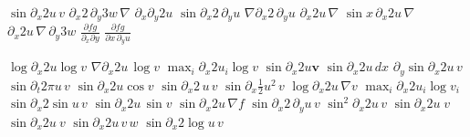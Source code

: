 \documentclass{article}
\begin{document}
$\sin\partial_x 2u\,v$ $\partial_x 2\,\partial_y 3w\,\nabla$ $\partial_x\partial_y 2u$ $\sin\partial_x 2\,\partial_y u$ $\nabla\partial_x 2\,\partial_y u$
$\partial_x 2u\,\nabla$ $\sin x\,\partial_x 2u\,\nabla$ $\partial_x 2u\,\nabla\,\partial_y 3w$ $\frac{\partial fg}{\partial_x\partial y}$
$\frac{\partial fg}{\partial x\,\partial_y u}$

$\log\partial_x 2u\log v$ $\nabla\partial_x 2u\,\log v$ $\max_i\partial_x 2u_i\log v$ $\sin\partial_x 2u\mathbf{v}$ $\sin\partial_x 2u\,dx$
$\partial_y\sin\partial_x 2u\,v$ $\sin\partial_t 2\pi u\,v$ $\sin\partial_x 2u\cos v$ $\sin\partial_x 2\,u\,v$ $\sin\partial_x\frac12 u^2\,v$
$\log\partial_x 2u\,\nabla v$ $\max_i\partial_x 2u_i\log v_i$ $\sin\partial_x 2\sin u\,v$ $\sin\partial_x 2u\,\sin v$ $\sin\partial_x 2u\,\nabla f$
$\sin\partial_x 2\,\partial_y u\,v$
$\sin^2\partial_x 2u\,v$ $\sin\partial_x 2u\;v$ $\sin\partial_x 2u~v$ $\sin\partial_x 2u\,v\,w$ $\sin\partial_x 2\log u\,v$
\end{document}
